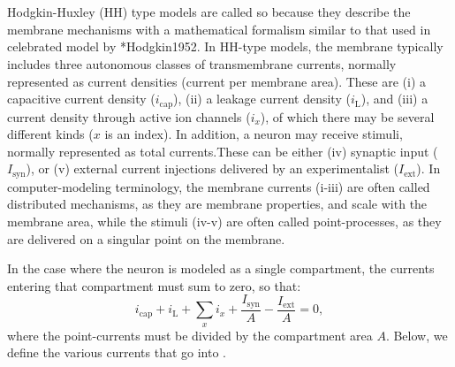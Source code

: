 \section{}
\label{sec:Neuron:membranecurrents}
Hodgkin-Huxley (HH) type models are called so because they describe the membrane mechanisms with a mathematical formalism similar to that used in celebrated model by \citeasnoun**{Hodgkin1952}. In HH-type models, the membrane typically includes three autonomous classes of transmembrane currents, normally represented as current densities (current per membrane area). These are (i) a capacitive current density ($i_{\mathrm{cap}}$), (ii) a leakage current density ($i_{\mathrm{L}}$), and (iii) a current density through active ion channels ($i_x$), of which there may be several different kinds ($x$ is an index). In addition, a neuron may receive stimuli, normally represented as total currents.These can be either (iv) synaptic input ($I_{\mathrm{syn}}$), or (v) external current injections delivered by an experimentalist ($I_{\mathrm{ext}}$). In computer-modeling terminology, the membrane currents (i-iii) are often called distributed mechanisms, as they are membrane properties, and scale with the membrane area, while the stimuli (iv-v) are often called point-processes, as they are delivered on a singular point on the membrane. 

In the case where the neuron is modeled as a single compartment, the currents entering that compartment must sum to zero, so that:
\begin{equation}
i_{\mathrm{cap}}+ i_{\mathrm{L}} + \sum_x{i_x} +  \frac{I_{\mathrm{syn}}}{A} - \frac{I_{\mathrm{ext}}}{A} = 0,
\label{eq:Neuron:singlecomp_zerosum}
\end{equation}
where the point-currents must be divided by the compartment area $A$.   Below, we define the various currents that go into . 

